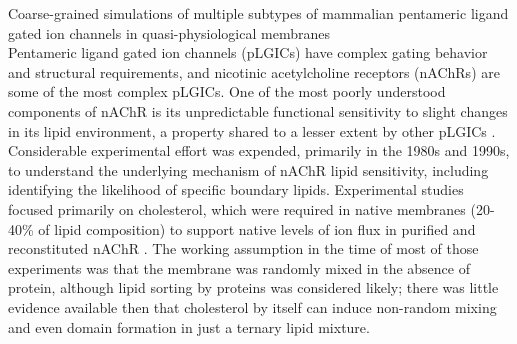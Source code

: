 \documentclass{article}
\begin{document}
Coarse-grained simulations of multiple subtypes of mammalian pentameric ligand gated ion channels in quasi-physiological membranes\\

Pentameric ligand gated ion channels (pLGICs) have complex gating behavior and structural requirements, and nicotinic acetylcholine receptors (nAChRs) are some of the most complex pLGICs. One of the most poorly understood components of nAChR is its unpredictable functional sensitivity to slight changes in its lipid environment, a property shared to a lesser extent by other pLGICs \cite{M.CriadoH.Eibl1982,Conti2013}. Considerable experimental effort \cite{Fong_Correlation_1986,Sunshine_Lipid_1992,Hamouda_Assessing_2006,Butler_FTIR_1993,Bhushan_Correlation_1993,Fong_Stabilization_1987,Corrie_Lipid_2002} was expended, primarily in the 1980s and 1990s, to understand the underlying mechanism of nAChR lipid sensitivity, including identifying the likelihood of specific boundary lipids. Experimental studies focused primarily on cholesterol, which were required in native membranes (20-40\% of lipid composition) to support native levels of ion flux in purified and reconstituted nAChR \cite{Fong_Correlation_1986,Fong_Stabilization_1987}.%
The working assumption in the time of most of those experiments was that the membrane was randomly mixed in the absence of protein, although lipid sorting by proteins was considered likely; there was little evidence available then that cholesterol by itself can induce non-random mixing and even domain formation in just a ternary lipid mixture. %
\end{document}
